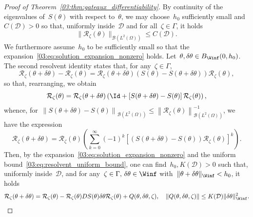 \begin{proof}[Proof of Theorem~\ref{03:thm:gateaux_differentiability}]
    By continuity of the eigenvalues of~$S(\theta)$ with respect to~$\theta$, we may choose~$h_0$ sufficiently small and~$C(\mathcal D)>0$ so that, uniformly inside~$\mathcal D$ and for all~$\zeta\in \Gamma$, it holds
    \begin{equation}
        \label{03:eq:resolvent_uniform_bound}
        \|\mathcal R_\zeta(\theta)\|_{\mathcal B(L^2(\Omega))} \leq C(\mathcal D).
    \end{equation}
    We furthermore assume~$h_0$ to be sufficiently small so that the expansion~\eqref{03:eq:solution_expansion_nonzero} holds.
    Let~$\theta,\delta\theta \in B_{\Winf}(0,h_0)$.
    The second resolvent identity states that, for any~$\zeta\in \Gamma$,
    \begin{equation}
        \mathcal R_\zeta(\theta+\delta\theta) - \mathcal R_\zeta(\theta) = \mathcal R_\zeta(\theta+\delta\theta)(S(\theta)-S(\theta+\delta\theta))\mathcal R_\zeta(\theta),
    \end{equation}
    so that, rearranging, we obtain
    \begin{equation}
        \mathcal R_\zeta(\theta) = \mathcal R_\zeta(\theta+\delta\theta)\left(\Id +\left[S(\theta+\delta\theta) - S(\theta)\right]\mathcal R_\zeta(\theta)\right),
    \end{equation}
    whence, for~$\left\|S(\theta+\delta\theta)-S(\theta)\right\|_{\mathcal B(L^2(\Omega))}\leq \left\|\mathcal R_\zeta(\theta)\right\|_{\mathcal B(L^2(\Omega))}^{-1}$, we have the expression
    \begin{equation}
        \label{03:eq:neumann_series}
        \mathcal R_\zeta(\theta+\delta\theta) = \mathcal R_\zeta(\theta)\left(\sum_{k=0}^\infty (-1)^k\left[\left(S(\theta+\delta\theta) - S(\theta)\right)\mathcal R_\zeta(\theta)\right]^k \right).
    \end{equation}
    Then, by the expansion~\eqref{03:eq:solution_expansion_nonzero} and the uniform bound~\eqref{03:eq:resolvent_uniform_bound}, one can find~$h_0,K(\mathcal D)>0$ such that, uniformly inside~$\mathcal D$, and for any~$\zeta\in\Gamma,\,\delta\theta\in\Winf$ with~$\|\theta+\delta\theta\|_{\Winf}<h_0$, it holds
     \begin{equation}
        \label{03:eq:neumann_series_expansion}
        \mathcal R_\zeta(\theta+\delta\theta) = \mathcal R_\zeta(\theta) - \mathcal R_\zeta(\theta) D S(\theta)\delta\theta\mathcal R_\zeta(\theta) + Q(\theta,\delta\theta,\zeta),\quad\|Q(\theta,\delta\theta,\zeta)\|\leq K(\mathcal D)\|\delta\theta\|_{\Winf}^2.
    \end{equation}

\end{proof}
